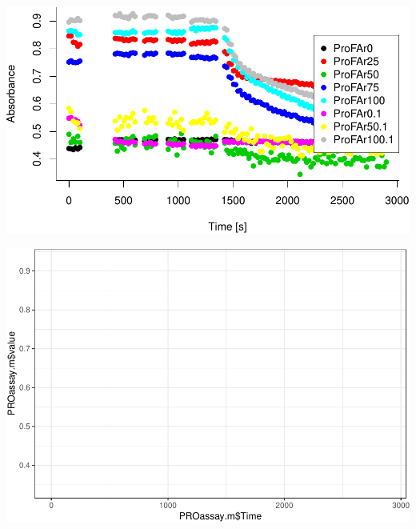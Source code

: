 \documentclass[12pt,twoside]{reedthesis}
\begin{document}
  \begin{center}\includegraphics{tesis_files/figure-latex/Cinetics-1} \end{center}
  
  \begin{Shaded}
  \begin{Highlighting}[]
  \NormalTok{(}  \NormalTok{) +}\StringTok{ }\NormalTok{() }
  \end{Highlighting}
  \end{Shaded}
  
  \begin{center}\includegraphics{tesis_files/figure-latex/Cinetics-2} \end{center}
  
\end{document}
